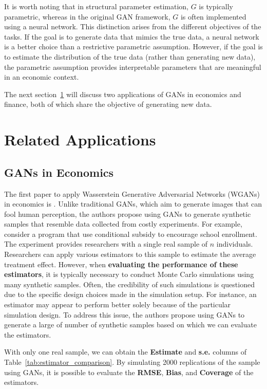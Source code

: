 \documentclass[12pt]{article}
\begin{document}
It is worth noting that in structural parameter estimation, \(G\) is typically
parametric, whereas in the original GAN framework, \(G\) is often implemented
using a neural network. This distinction arises from the different objectives
of the tasks. If the goal is to generate data that mimics the true data, a
neural network is a better choice than a restrictive parametric assumption.
However, if the goal is to estimate the distribution of the true data (rather
than generating new data), the parametric assumption provides interpretable
parameters that are meaningful in an economic context.

The next section~\ref{sec:related_applications} will discuss two applications
of GANs in economics and finance, both of which share the objective of
generating new data.

\section{Related Applications} \label{sec:related_applications}

\subsection{GANs in Economics}
The first paper to apply Wasserstein Generative Adversarial Networks (WGANs) in
economics is \citet{athey2024using}. Unlike traditional GANs, which aim to
generate images that can fool human perception, the authors propose using GANs
to generate synthetic samples that resemble data collected from costly
experiments. For example, consider a program that use conditional subsidy to
encourage school enrollment. The experiment provides researchers with a single
real sample of \(n\) individuals. Researchers can apply various estimators to
this sample to estimate the average treatment effect. However, when
\textbf{evaluating the performance of these estimators}, it is typically
necessary to conduct Monte Carlo simulations using many synthetic samples.
Often, the credibility of such simulations is questioned due to the specific
design choices made in the simulation setup. For instance, an estimator may
appear to perform better solely because of the particular simulation design. To
address this issue, the authors propose using GANs to generate a large of
number of synthetic samples based on which we can evaluate the estimators.

With only one real sample, we can obtain the \textbf{Estimate} and
\textbf{s.e.} columns of Table~\ref{tab:estimator_comparison}. By simulating
2000 replications of the sample using GANs, it is possible to evaluate the
\textbf{RMSE}, \textbf{Bias}, and \textbf{Coverage} of the estimators.
\end{document}
